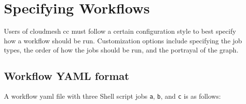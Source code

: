 \section{Specifying Workflows}\label{specifying-workflows}

Users of cloudmesh cc must follow a certain configuration style to best
specify how a workflow should be run. Customization options include
specifying the job types, the order of how the jobs should be run, and
the portrayal of the graph.

\subsection{Workflow YAML format}\label{workflow-yaml-format}

A workflow yaml file with three Shell script jobs \texttt{a},
\texttt{b}, and \texttt{c} is as follows:

\begin{Shaded}
\begin{Highlighting}[]
        
        
       
    \ExtensionTok{{-}}
\end{Highlighting}
\end{Shaded}

